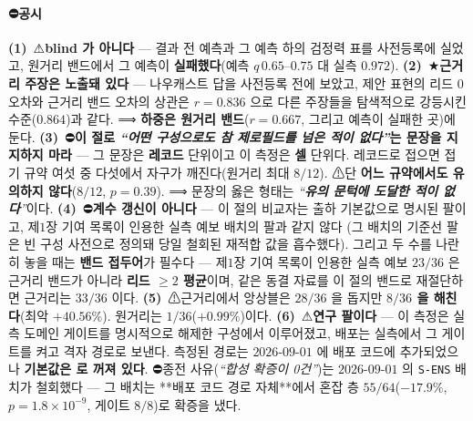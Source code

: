 \documentclass[11pt]{report}
\numberwithin{equation}{chapter}
\numberwithin{figure}{chapter}
\numberwithin{table}{chapter}
\begin{document}
\paragraph{⛔공시}
\textbf{(1)}~⚠\textbf{blind 가 아니다} --- 결과 전 예측과 그 예측 하의 검정력 표를
사전등록에 실었고, 원거리 밴드에서 그 예측이 \textbf{실패했다}(예측 $q\,0.65$--$0.75$
대 실측 $0.972$).
\textbf{(2)}~★\textbf{근거리 주장은 노출돼 있다} --- 나우캐스트 답을 사전등록 전에 보았고,
제안 표현의 리드 $0$ 오차와 근거리 밴드 오차의 상관은 $r = 0.836$ 으로 다른 주장들을
탐색적으로 강등시킨 수준($0.864$)과 같다. ⟹ \textbf{하중은 원거리 밴드}($r = 0.667$,
그리고 예측이 실패한 곳)에 둔다.
\textbf{(3)}~⛔\textbf{이 절로 \emph{``어떤 구성으로도 참 제로필드를 넘은 적이 없다''}는
문장을 지지하지 마라} --- 그 문장은 \textbf{레코드} 단위이고 이 측정은 \textbf{셀}
단위다. 레코드로 접으면 접기 규약 여섯 중 다섯에서 자구가 깨진다(원거리 최대 $8/12$).
⚠단 \textbf{어느 규약에서도 유의하지 않다}($8/12$, $p = 0.39$). ⟹ 문장의 옳은 형태는
\emph{``\textbf{유의 문턱에 도달한 적이 없다}''}이다.
\textbf{(4)}~⛔\textbf{계수 갱신이 아니다} --- 이 절의 비교자는 출하 기본값으로 명시된
팔이고, 제$1$장 기여 목록이 인용한 실측 예보 배치의 팔과 같지 않다
(그 배치의 기준선 팔은 빈 구성 사전으로 정의돼 당일 철회된 재적합 값을 흡수했다). 그리고 두 수를 나란히 놓을 때는
\textbf{밴드 접두어}가 필수다 --- 제$1$장 기여 목록이 인용한 실측 예보 $23/36$ 은
근거리 밴드가 아니라 \textbf{리드 $\ge 2$ 평균}이며, 같은 동결 자료를 이 절의 밴드로
재절단하면 근거리는 $33/36$ 이다.
\textbf{(5)}~⚠근거리에서 앙상블은 $28/36$ 을 돕지만 \textbf{$8/36$ 을 해친다}(최악
$+40.56\%$). 원거리는 $1/36$($+0.99\%$)이다.
\textbf{(6)}~⚠\textbf{연구 팔이다} --- 이 측정은 실측 도메인 게이트를 명시적으로 해제한
구성에서 이루어졌고, 배포는 실측에서 그 게이트를 켜고 격자 경로로 보낸다. 측정된 경로는
$2026$-$09$-$01$ 에 배포 코드에 추가되었으나 \textbf{기본값은
\DeployLearnedEnsembleK{} 로 꺼져 있다}.
⛔종전 사유(\emph{``합성 확증이 0건''})는 $2026$-$09$-$01$ 의 \texttt{S-ENS} 배치가
철회했다 --- 그 배치는 **배포 코드 경로 자체**에서 혼잡 층 $55/64$($-17.9\%$,
$p = 1.8\times10^{-9}$, 게이트 $8/8$)로 확증을 냈다.
\end{document}

